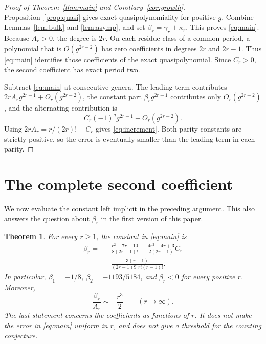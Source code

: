 \documentclass[11pt]{article}
\newtheorem{theorem}{Theorem}[section]
\theoremstyle{remark}\newtheorem{remark}[theorem]{Remark}
\begin{document}
\begin{proof}[Proof of Theorem~\ref{thm:main} and Corollary~\ref{cor:growth}]
Proposition~\ref{prop:quasi} gives exact quasipolynomiality for positive $g$. Combine Lemmas~\ref{lem:bulk} and \ref{lem:asymp}, and set $\beta_r=\gamma_r+\kappa_r$. This proves \eqref{eq:main}. Because $A_r>0$, the degree is $2r$. On each residue class of a common period, a polynomial that is $O(g^{2r-2})$ has zero coefficients in degrees $2r$ and $2r-1$. Thus \eqref{eq:main} identifies those coefficients of the exact quasipolynomial. Since $C_r>0$, the second coefficient has exact period two.

Subtract \eqref{eq:main} at consecutive genera. The leading term contributes $2rA_rg^{2r-1}+O_r(g^{2r-2})$, the constant part $\beta_rg^{2r-1}$ contributes only $O_r(g^{2r-2})$, and the alternating contribution is
\[
 C_r(-1)^gg^{2r-1}+O_r(g^{2r-2}).
\]
Using $2rA_r=r/(2r)!+C_r$ gives \eqref{eq:increment}. Both parity constants are strictly positive, so the error is eventually smaller than the leading term in each parity.
\end{proof}

\section{The complete second coefficient}

We now evaluate the constant left implicit in the preceding argument. This
also answers the question about $\beta_r$ in the first version of this paper.

\begin{theorem}\label{thm:second}
For every $r\ge1$, the constant in \eqref{eq:main} is
\begin{equation}\label{eq:beta-explicit}
\begin{split}
\beta_r={}&-\frac{r^2+7r-10}{8(2r-1)!}
-\frac{4r^2-4r+3}{2(2r-1)}C_r\\
&-\frac{3(r-1)}{(2r-1)9^r r!(r-1)!}.
\end{split}
\end{equation}
In particular, $\beta_1=-1/8$, $\beta_2=-1193/5184$, and $\beta_r<0$
for every positive $r$. Moreover,
\begin{equation}\label{eq:coefficient-scale}
\frac{\beta_r}{A_r}\sim-\frac{r^3}{2}\qquad(r\longrightarrow\infty).
\end{equation}
The last statement concerns the coefficients as functions of $r$. It does
not make the error in \eqref{eq:main} uniform in $r$, and does not give a
threshold for the counting conjecture.
\end{theorem}
\end{document}
